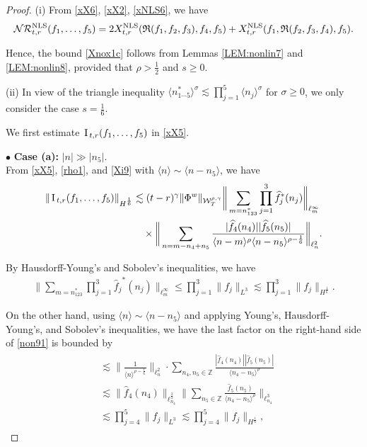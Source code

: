 \documentclass[letterpaper, 11pt,  reqno]{amsart}
\newcommand{\1}{\hspace{0.5mm}\text{I}\hspace{0.5mm}}
\newcommand{\noi}{\noindent}
\newcommand{\Z}{\mathbb{Z}}
\newcommand{\bul}{\bullet}
\newcommand{\RR}{\mathcal{R}}
\newcommand{\Rf}{\mathfrak{R}}
\newcommand{\g}{\gamma}
\newcommand{\s}{\sigma}
\newcommand{\ft}{\widehat}
\renewcommand{\l}{\ell}
\newcommand{\les}{\lesssim}
\newcommand{\jb}[1]
{\langle #1 \rangle}
\newcommand{\NN}{\mathcal{N}}
\newcommand{\W}{\mathcal{W}}
\newcommand{\NLS}{\text{\rm NLS} }
\numberwithin{equation}{section}
\numberwithin{theorem}{section}
\begin{document}
\begin{proof}
(i) 
From 
\eqref{xX6}, \eqref{xX2}, \eqref{xNLS6}, we have 
\begin{align*}
\NN \RR^\NLS_{t, r}(f_1, \dots, f_5)
= 2X^\NLS_{t,r}  ( \Rf(f_1, f_2, f_3) , f _4, f_5)
+ X^\NLS_{t,r}  ( f_1, \Rf(f_2, f_3, f_4) ,  f_5).
\end{align*}

\noi
Hence, the bound
\eqref{Xnox1c} follows from Lemmas \ref{LEM:nonlin7}
and \ref{LEM:nonlin8}, 
provided that $\rho > \frac 12 $ and $s \ge 0$.


\medskip





\noi
(ii) 
In view of the triangle inequality $\jb{n_{1\cdots5}^*}^\s \les \prod_{j= 1}^5 \jb{n_j}^\s$
for $\s \ge 0$, we only consider the case $s = \frac 16 $.


We first estimate $\1_{t, r}(f_1, \dots, f_5)$ in \eqref{xX5}.
\medskip


\noi
$\bul$ {\bf Case (a):} $|n|\gg |n_5|$.\\ %
\indent
From \eqref{xX5}, \eqref{rho1}, and \eqref{Xi9}
with 
$\jb{n} \sim \jb{n - n_5}$, 
we have 
\begin{align}
\begin{split}
 \|\1_{t, r}(f_1, \dots, f_5)\|_{H^\frac 16}
&  
\les 
(t - r)^\g
\|\Phi^w\|_{  \W^{\rho,\g}_T} 
\bigg\| \sum_{m = n_{123}^*}
\prod_{j = 1}^3
{\ft f_j}^*(n_j)\bigg\|_{\l^\infty_{m}}\\
& \quad \times \bigg\| 
\sum_{n = m - n_4 + n_5}
\frac {|\ft f_4(n_4)|  |\ft f_5(n_5)|}{\jb{n - m}^{\rho}\jb{n - n_5}^{\rho - \frac 16}}
\bigg\|_{\l^2_n}.
\end{split}
\label{non91}
\end{align}


\noi
By Hausdorff-Young's and Sobolev's inequalities, we have 
\begin{align}
\bigg\| \sum_{m = n_{123}^*}
\prod_{j = 1}^3
{\ft f_j}^*(n_j)\bigg\|_{\l^\infty_{m}}
\le \prod_{j = 1}^3 \|f_j\|_{L^3}\les \prod_{j = 1}^3 \|f_j\|_{H^\frac 16}.
\label{non92}
\end{align}


\noi
On the other hand, 
using  $\jb{n} \sim \jb{n - n_5}$
and applying Young's,  
Hausdorff-Young's,  and Sobolev's inequalities, we have 
the last factor on the right-hand side of \eqref{non91} is bounded by 
\begin{align}
\begin{split}
& \les 
\bigg\|\frac 1{\jb{n}^{\rho - \frac 16}}
\bigg\|_{\l^2_n}
\cdot \sum_{n_4, n_5 \in \Z}
\frac {|\ft f_4(n_4)|  |\ft f_5(n_5)|}{\jb{n_4 - n_5}^{\rho}}\\
& \les 
\| \ft f_4(n_4)\|_{\l^\frac 32_{n_4}}  
\bigg\|
\sum_{n_5 \in \Z}
\frac{\ft f_5(n_5)}{\jb{n_4 - n_5}^{\rho}}\bigg\|_{\l^3_{n_4}}\\
& \les \prod_{j = 4}^5 \|f_j\|_{L^3}\les \prod_{j = 4}^5 \|f_j\|_{H^\frac 16}, 
\end{split}
\label{non93}
\end{align}


\end{proof}
\end{document}
